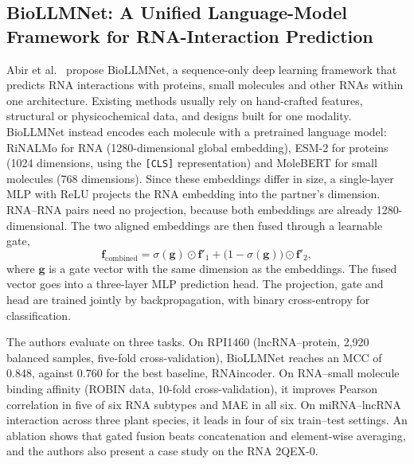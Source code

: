 \documentclass{FastFyp}
\begin{document}
\subsection{BioLLMNet: A Unified Language-Model Framework for RNA-Interaction Prediction}
Abir et al.~\cite{abir2025biollmnet} propose BioLLMNet, a sequence-only deep learning framework that predicts RNA interactions with proteins, small molecules and other RNAs within one architecture. Existing methods usually rely on hand-crafted features, structural or physicochemical data, and designs built for one modality. BioLLMNet instead encodes each molecule with a pretrained language model: RiNALMo for RNA (1280-dimensional global embedding), ESM-2 for proteins (1024 dimensions, using the \texttt{[CLS]} representation) and MoleBERT for small molecules (768 dimensions). Since these embeddings differ in size, a single-layer MLP with ReLU projects the RNA embedding into the partner's dimension. RNA--RNA pairs need no projection, because both embeddings are already 1280-dimensional. The two aligned embeddings are then fused through a learnable gate,
\begin{equation}
  \mathbf{f}_{\text{combined}} = \sigma(\mathbf{g}) \odot \mathbf{f}'_1 + \bigl(1 - \sigma(\mathbf{g})\bigr) \odot \mathbf{f}'_2,
  \label{eq:biollmnet-gate}
\end{equation}
where $\mathbf{g}$ is a gate vector with the same dimension as the embeddings. The fused vector goes into a three-layer MLP prediction head. The projection, gate and head are trained jointly by backpropagation, with binary cross-entropy for classification.

The authors evaluate on three tasks. On RPI1460 (lncRNA--protein, 2,920 balanced samples, five-fold cross-validation), BioLLMNet reaches an MCC of 0.848, against 0.760 for the best baseline, RNAincoder. On RNA--small molecule binding affinity (ROBIN data, 10-fold cross-validation), it improves Pearson correlation in five of six RNA subtypes and MAE in all six. On miRNA--lncRNA interaction across three plant species, it leads in four of six train--test settings. An ablation shows that gated fusion beats concatenation and element-wise averaging, and the authors also present a case study on the RNA 2QEX-0.
\end{document}
